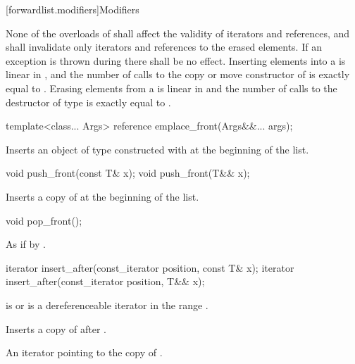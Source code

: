 [forwardlist.modifiers]{Modifiers}

\pnum
None of the overloads of  shall affect the validity of iterators and
references, and  shall invalidate only iterators and references to
the erased elements. If an exception is thrown during  there shall
be no effect. Inserting  elements into a  is linear in
, and the number of calls to the copy or move constructor of  is
exactly equal to . Erasing  elements from a  is
linear in  and the number of calls to the destructor of type  is
exactly equal to .

%
\begin{itemdecl}
template<class... Args> reference emplace_front(Args&&... args);
\end{itemdecl}

\begin{itemdescr}
\pnum
\effects Inserts an object of type  constructed with
 at the beginning of the list.
\end{itemdescr}

%
\begin{itemdecl}
void push_front(const T& x);
void push_front(T&& x);
\end{itemdecl}

\begin{itemdescr}
\pnum
\effects Inserts a copy of  at the beginning of the list.
\end{itemdescr}


%
\begin{itemdecl}
void pop_front();
\end{itemdecl}

\begin{itemdescr}
\pnum
\effects As if by .
\end{itemdescr}

%
\begin{itemdecl}
iterator insert_after(const_iterator position, const T& x);
iterator insert_after(const_iterator position, T&& x);
\end{itemdecl}

\begin{itemdescr}
\pnum
\requires {} is  or is a dereferenceable
iterator in the range .

\pnum
\effects Inserts a copy of  after .

\pnum
\returns An iterator pointing to the copy of .
\end{itemdescr}

